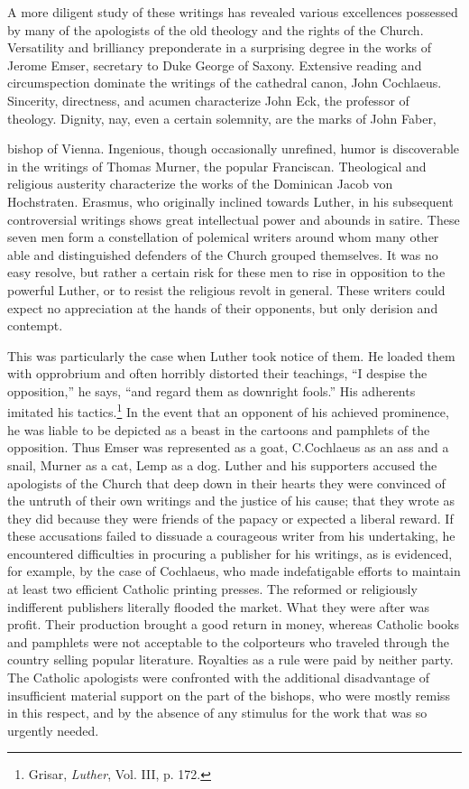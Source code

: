 A more diligent study of these writings has revealed various excellences
possessed by many of the apologists of the old theology and
the rights of the Church. Versatility and brilliancy preponderate in
a surprising degree in the works of Jerome Emser, secretary to Duke
George of Saxony. Extensive reading and circumspection dominate
the writings of the cathedral canon, John Cochlaeus. Sincerity, directness, and acumen characterize John Eck, the professor of theology.
Dignity, nay, even a certain solemnity, are the marks of John Faber,

bishop of Vienna. Ingenious, though occasionally unrefined, humor is
discoverable in the writings of Thomas Murner, the popular Franciscan. Theological and religious austerity characterize the works of
the Dominican Jacob von Hochstraten. Erasmus, who originally
inclined towards Luther, in his subsequent controversial writings
shows great intellectual power and abounds in satire. These seven men
form a constellation of polemical writers around whom many other
able and distinguished defenders of the Church grouped themselves.
It was no easy resolve, but rather a certain risk for these men to
rise in opposition to the powerful Luther, or to resist the religious
revolt in general. These writers could expect no appreciation at the
hands of their opponents, but only derision and contempt.

This was particularly the case when Luther took notice of them. He
loaded them with opprobrium and often horribly distorted their teachings,
“I despise the opposition,” he says, “and regard them as downright fools.”
His adherents imitated his tactics.\footnote{Grisar, \textit{Luther}, Vol. III, p. 172.}
In the event that an opponent of his
achieved prominence, he was liable to be depicted as a beast in the cartoons
and pamphlets of the opposition. Thus Emser was represented as a goat,
C.Cochlaeus as an ass and a snail, Murner as a cat, Lemp as a dog. Luther and
his supporters accused the apologists of the Church that deep down in their
hearts they were convinced of the untruth of their own writings and the
justice of his cause; that they wrote as they did because they were friends of
the papacy or expected a liberal reward. If these accusations failed to dissuade
a courageous writer from his undertaking, he encountered difficulties in
procuring a publisher for his writings, as is evidenced, for example, by the case
of Cochlaeus, who made indefatigable efforts to maintain at least two efficient
Catholic printing presses. The reformed or religiously indifferent publishers
literally flooded the market. What they were after was profit. Their production
brought a good return in money, whereas Catholic books and pamphlets
were not acceptable to the colporteurs who traveled through the country
selling popular literature. Royalties as a rule were paid by neither party. The
Catholic apologists were confronted with the additional disadvantage of insufficient
material support on the part of the bishops, who were mostly remiss in
this respect, and by the absence of any stimulus for the work that
was so urgently needed.

